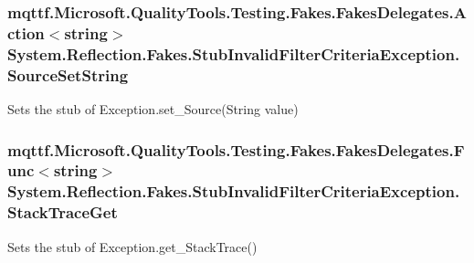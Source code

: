 \hypertarget{class_system_1_1_reflection_1_1_fakes_1_1_stub_invalid_filter_criteria_exception_a73124184228206beba503cba5b6a5d3c}{
\subsubsection[{Source\-Set\-String}]{\setlength{\rightskip}{0pt plus 5cm}mqttf.\-Microsoft.\-Quality\-Tools.\-Testing.\-Fakes.\-Fakes\-Delegates.\-Action$<$string$>$ System.\-Reflection.\-Fakes.\-Stub\-Invalid\-Filter\-Criteria\-Exception.\-Source\-Set\-String}}\label{class_system_1_1_reflection_1_1_fakes_1_1_stub_invalid_filter_criteria_exception_a73124184228206beba503cba5b6a5d3c}


Sets the stub of Exception.\-set\-\_\-\-Source(\-String value)

\hypertarget{class_system_1_1_reflection_1_1_fakes_1_1_stub_invalid_filter_criteria_exception_a8080c53decc13e5cb4f27fa2c17db7d8}{
\subsubsection[{Stack\-Trace\-Get}]{\setlength{\rightskip}{0pt plus 5cm}mqttf.\-Microsoft.\-Quality\-Tools.\-Testing.\-Fakes.\-Fakes\-Delegates.\-Func$<$string$>$ System.\-Reflection.\-Fakes.\-Stub\-Invalid\-Filter\-Criteria\-Exception.\-Stack\-Trace\-Get}}\label{class_system_1_1_reflection_1_1_fakes_1_1_stub_invalid_filter_criteria_exception_a8080c53decc13e5cb4f27fa2c17db7d8}


Sets the stub of Exception.\-get\-\_\-\-Stack\-Trace()

